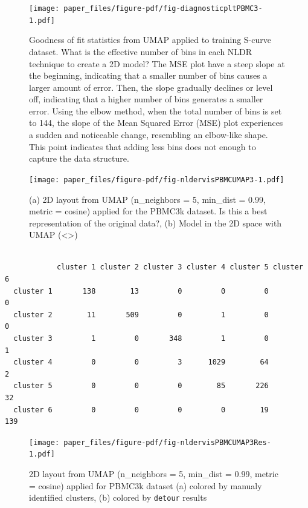 \documentclass[
  12pt]{article}
\begin{document}
\begin{figure}

{\centering \texttt{[image: paper\_files/figure-pdf/fig-diagnosticpltPBMC3-1.pdf]}

}

\caption{\label{fig-diagnosticpltPBMC3}Goodness of fit statistics from
UMAP applied to training S-curve dataset. What is the effective number
of bins in each NLDR technique to create a 2D model? The MSE plot have a
steep slope at the beginning, indicating that a smaller number of bins
causes a larger amount of error. Then, the slope gradually declines or
level off, indicating that a higher number of bins generates a smaller
error. Using the elbow method, when the total number of bins is set to
144, the slope of the Mean Squared Error (MSE) plot experiences a sudden
and noticeable change, resembling an elbow-like shape. This point
indicates that adding less bins does not enough to capture the data
structure.}

\end{figure}

\begin{figure}[h]

{\centering \texttt{[image: paper\_files/figure-pdf/fig-nldervisPBMCUMAP3-1.pdf]}

}

\caption{\label{fig-nldervisPBMCUMAP3}(a) 2D layout from UMAP
(n\_neighbors = 5, min\_dist = 0.99, metric = cosine) applied for the
PBMC3k dataset. Is this a best representation of the original data?, (b)
Model in the 2D space with UMAP (\textless\textgreater)}

\end{figure}

\begin{verbatim}
           
            cluster 1 cluster 2 cluster 3 cluster 4 cluster 5 cluster 6
  cluster 1       138        13         0         0         0         0
  cluster 2        11       509         0         1         0         0
  cluster 3         1         0       348         1         0         1
  cluster 4         0         0         3      1029        64         2
  cluster 5         0         0         0        85       226        32
  cluster 6         0         0         0         0        19       139
\end{verbatim}

\begin{figure}

{\centering \texttt{[image: paper\_files/figure-pdf/fig-nldervisPBMCUMAP3Res-1.pdf]}

}

\caption{\label{fig-nldervisPBMCUMAP3Res}2D layout from UMAP
(n\_neighbors = 5, min\_dist = 0.99, metric = cosine) applied for PBMC3k
dataset (a) colored by manualy identified clusters, (b) colored by
\texttt{detour} results}

\end{figure}
\end{document}

